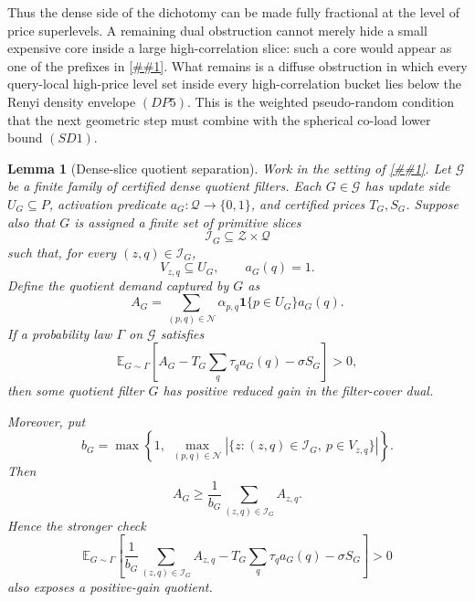 \documentclass[10pt]{article}
\newcommand{\cref}[1]{\ref{##1}}
\newtheorem{lemma}[theorem]{Lemma}
\theoremstyle{definition}
\newcommand{\E}{\mathbb{E}}
\begin{document}
Thus the dense side of the dichotomy can be made fully fractional at the level
of price superlevels.  A remaining dual obstruction cannot merely hide a small
expensive core inside a large high-correlation slice: such a core would appear as
one of the prefixes in \cref{lem:dense-slice-prefix-separation}.  What remains is
a diffuse obstruction in which every query-local high-price level set inside
every high-correlation bucket lies below the Renyi density envelope \((DP5)\).
This is the weighted pseudo-random condition that the next geometric step must
combine with the spherical co-load lower bound \((SD1)\).

\begin{lemma}[Dense-slice quotient separation]
   \label{lem:dense-slice-quotient-separation}
   Work in the setting of \cref{lem:high-correlation-dense-slice-separator}.
   Let \(\mathcal G\) be a finite family of certified dense quotient filters.
   Each \(G\in\mathcal G\) has update side \(U_G\subseteq P\), activation
   predicate \(a_G:\mathcal Q\to\{0,1\}\), and certified prices \(T_G,S_G\).
   Suppose also that \(G\) is assigned a finite set of primitive slices
   \[
      \mathcal I_G\subseteq\mathcal Z\times\mathcal Q
   \]
   such that, for every \((z,q)\in\mathcal I_G\),
   \[
      V_{z,q}\subseteq U_G,
      \qquad
      a_G(q)=1 .
      \tag{DQ1}
   \]
   Define the quotient demand captured by \(G\) as
   \[
      A_G=
      \sum_{(p,q)\in\mathcal N}
      \alpha_{p,q}\mathbf 1\{p\in U_G\}a_G(q).
      \tag{DQ2}
   \]
   If a probability law \(\Gamma\) on \(\mathcal G\) satisfies
   \[
      \E_{G\sim\Gamma}
      \left[
         A_G
         -
         T_G\sum_q\tau_qa_G(q)
         -
         \sigma S_G
      \right]
      >0,
      \tag{DQ3}
   \]
   then some quotient filter \(G\) has positive reduced gain in the
   filter-cover dual.

   Moreover, put
   \[
      b_G=
      \max\left\{
         1,\;
         \max_{(p,q)\in\mathcal N}
         \left|
            \{z:(z,q)\in\mathcal I_G,\ p\in V_{z,q}\}
         \right|
      \right\}.
      \tag{DQ4}
   \]
   Then
   \[
      A_G
      \ge
      \frac1{b_G}
      \sum_{(z,q)\in\mathcal I_G}A_{z,q}.
      \tag{DQ5}
   \]
   Hence the stronger check
   \[
      \E_{G\sim\Gamma}
      \left[
         \frac1{b_G}
         \sum_{(z,q)\in\mathcal I_G}A_{z,q}
         -
         T_G\sum_q\tau_qa_G(q)
         -
         \sigma S_G
      \right]
      >0
      \tag{DQ6}
   \]
   also exposes a positive-gain quotient.
\end{lemma}
\end{document}
